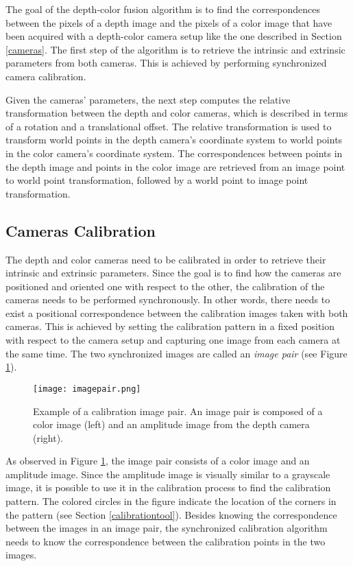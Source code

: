 The goal of the depth-color fusion algorithm is to find the correspondences between the pixels of a depth 
image and the pixels of a color image that have been acquired with a depth-color camera setup like the one 
described in Section \ref{cameras}. The first step of the algorithm is to retrieve the intrinsic and extrinsic 
parameters from both cameras. This is achieved by performing synchronized camera calibration. 

Given the cameras' parameters, the next step computes the relative transformation between the depth 
and color cameras, which is described in terms of a rotation and a translational offset. The relative 
transformation is used to transform world points in the depth camera's coordinate system to world points in
the color camera's coordinate system. The correspondences between points in the depth image and points 
in the color image are retrieved from an image point to world point transformation, followed by a world point 
to image point transformation.


\subsection{Cameras Calibration} \label{camerascalibration}


The depth and color cameras need to be calibrated in order to retrieve their intrinsic and extrinsic 
parameters. Since the goal is to find how the cameras are positioned and oriented one with respect to the 
other, the calibration of the cameras needs to be performed synchronously. In other words, there needs
to exist a positional correspondence between the calibration images taken with both cameras. This is 
achieved by setting the calibration pattern in a fixed position with respect to the camera setup and capturing 
one image from each camera at the same time. The two synchronized images are called an 
\textit{image pair} (see Figure \ref{imagepair}). 

\begin{figure}[t]
	\center
	\texttt{[image: imagepair.png]}
	\caption[Example of a calibration image pair]{Example of a calibration image pair. An image pair is 
	composed of a color image (left) and an amplitude image from the depth camera (right).}
	\label{imagepair}
\end{figure}

As observed in Figure \ref{imagepair}, the image pair consists of a color image and an amplitude image. 
Since the amplitude image is visually similar to a grayscale image, it is possible to use it in the calibration 
process to find the calibration pattern. The colored circles in the figure indicate the location of the corners
in the pattern (see Section \ref{calibrationtool}). Besides knowing the correspondence between the images 
in an image pair, the synchronized calibration algorithm needs to know the correspondence between the 
calibration points in the two images.




